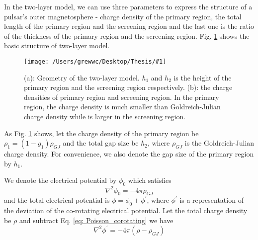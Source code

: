 \documentclass[12pt]{report}
\newcommand{\singleFig}[3]{
  \begin{figure}[!ht]
    \centering
    \texttt{[image: /Users/grewwc/Desktop/Thesis/\#1]}
    \caption{#3}
    \label{fig: #1}
  \end{figure}
}
\newcommand{\myComment}[1]{
  \newline
}
\begin{document}
        In the two-layer model, we can use three parameters to express the structure of a pulsar's outer 
        magnetosphere - charge density of the primary region, the total length of the primary region and the 
        screening region and the last one is the ratio of the thickness of the primary region and the 
        screening region. Fig. \ref{fig: charge_density} shows the basic structure of two-layer model. 

        \singleFig{charge_density}{0.6}{(a): Geometry of the two-layer model. $h_{1}$ and $h_{2}$ is the height
        of the primary region and the screening region respectively. (b): the charge densities of primary region and 
        screening region. In the primary region, the charge density is much smaller than Goldreich-Julian charge density
        while is larger in the screening region.}

        As Fig. \ref{fig: charge_density} shows, 
        let the charge density of the primary region be $\rho_1 = (1-g_{1}) \rho_{GJ}$ and 
        the total gap size be
        $h_{2}$, where $\rho_{GJ}$ is the Goldreich-Julian charge density. For convenience, 
        we also denote the gap size of the primary region by $h_{1}$. 
        \myComment{Then we can calculate electric potential and electric field by solving the Poisson equation }

        We denote the electrical potential by $\phi_{0}$ which satisfies 
        \begin{equation}
          \label{eq: Poisson_corotating}
          \nabla^{2}\phi_{0} = -4\pi\rho_{GJ}
        \end{equation}
        and the total electrical potential is $\phi = \phi_{0} + \phi^{\prime}$, where $\phi^{\prime}$ is a 
        representation of the deviation of the co-rotating electrical potential.  
        Let the total charge density be $\rho$ and subtract Eq. \ref{eq: Poisson_corotating} we have 
        \begin{equation}
          \label{eq: Poisson_final}
          \nabla^{2}\phi^{\prime} = -4\pi\left(\rho - \rho_{GJ} \right)
        \end{equation}
\end{document}
